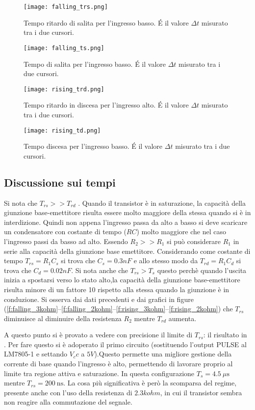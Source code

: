\begin{figure}
\centering
	\texttt{[image: falling\_trs.png]}
	\caption{Tempo ritardo di salita per l'ingresso basso. \'E il valore $\Delta t$ misurato tra i due cursori.\label{f:Trs}}
\end{figure}
\begin{figure}
	\centering
	\texttt{[image: falling\_ts.png]}
	\caption{Tempo di salita per l'ingresso basso. \'E il valore $\Delta t$ misurato tra i due cursori.\label{f:Ts}}
\end{figure}
\begin{figure}
	\centering
	\texttt{[image: rising\_trd.png]}
	\caption{Tempo ritardo in discesa per l'ingresso alto. \'E il valore $\Delta t$ misurato tra i due cursori.\label{f:Trd}}
\end{figure}
\begin{figure}
	\centering
	\texttt{[image: rising\_td.png]}
	\caption{Tempo discesa per l'ingresso basso. \'E il valore $\Delta t$ misurato tra i due cursori.\label{f:Td}}
\end{figure}

\subsection{Discussione sui tempi}
Si nota che $T_{rs} >> T_{rd}$ . Quando il transistor è in saturazione, la capacità della giunzione base-emettitore risulta essere molto maggiore della stessa quando si è in interdizione. Quindi non appena l'ingresso passa da alto a basso si deve scaricare un condensatore con costante di tempo ($RC$) molto maggiore che nel caso l'ingresso passi da basso ad alto. Essendo $R_2 >> R_1$ si può considerare $R_1$ in serie alla capacità della giunzione base emettitore. Considerando come costante di tempo $T_{rs} = R_1C_s$ si trova che $C_s= 0.3 nF$ e allo stesso modo da $T_{rd}= R_1C_d$ si trova che $C_d = 0.02 nF$. 
Si nota anche che $T_{rs} >T_s $ questo perchè quando l'uscita inizia a spostarsi verso lo stato alto,la capacità della giunzione base-emettitore risulta minore di un fattore 10 rispetto alla stessa quando la giunzione è in conduzione.
Si osserva dai dati precedenti e dai grafici in figure (\ref{f:falling_3kohm}--\ref{f:falling_2kohm}--\ref{f:rising_3kohm}--\ref{f:rising_2kohm}) che $T_{rs}$ diminuisce al diminuire della resistenza $R_2$ mentre $T_{rd} $ aumenta.

A questo punto si è provato a vedere con precisione il limite di $T_{rs}$: il risultato in . Per fare questo si è adoperato il primo circuito (sostituendo l'output PULSE al LM7805-1 e settando $V_cc$ a $5 V$).Questo permette una migliore gestione della corrente di base quando l'ingresso è alto, permettendo di lavorare proprio al limite tra regione attiva e saturazione. In questa configurazione $T_s=\SI{4.5}{\mu\s}$ mentre $T_{rs}=\SI{200}{\ns}$. La cosa più significativa è però la scomparsa del regime, presente anche con l'uso della resistenza di $2.3 kohm$, in cui il transistor sembra non reagire alla commutazione del segnale.

